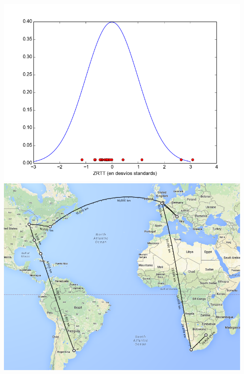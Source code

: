  \includegraphics[width=5in]{imgs/pretoria_dist.png}
 \includegraphics[width=5in]{imgs/maps/pretoria.png}
